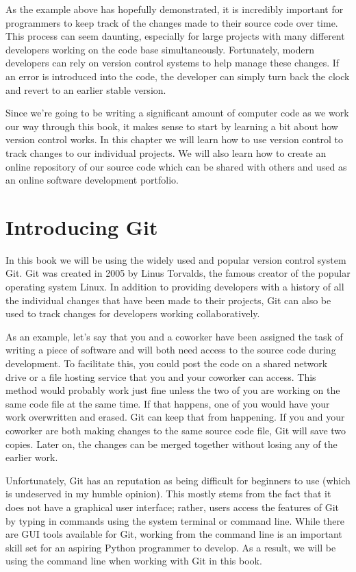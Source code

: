 \documentclass{book}
\begin{document}
As the example above has hopefully demonstrated, it is incredibly important for programmers to keep track of the changes made to their source code over time. This process can seem daunting, especially for large projects with many different developers working on the code base simultaneously. Fortunately, modern developers can rely on version control systems to help manage these changes. If an error is introduced into the code, the developer can simply turn back the clock and revert to an earlier stable version. 

Since we're going to be writing a significant amount of computer code as we work our way through this book, it makes sense to start by learning a bit about how version control works. In this chapter we will learn how to use version control to track changes to our individual projects. We will also learn how to create an online repository of our source code which can be shared with others and used as an online software development portfolio.

\section{Introducing Git}

In this book we will be using the widely used and popular version control system Git\texttrademark. Git was created in 2005 by Linus Torvalds, the famous creator of the popular operating system Linux. In addition to providing developers with a history of all the individual changes that have been made to their projects, Git can also be used to track changes for developers working collaboratively. 

As an example, let's say that you and a coworker have been assigned the task of writing a piece of software and will both need access to the source code during development. To facilitate this, you could post the code on a shared network drive or a file hosting service that you and your coworker can access. This method would probably work just fine unless the two of you are working on the same code file at the same time. If that happens, one of you would have your work overwritten and erased. Git can keep that from happening. If you and your coworker are both making changes to the same source code file, Git will save two copies. Later on, the changes can be merged together without losing any of the earlier work. 

Unfortunately, Git has an reputation as being difficult for beginners to use (which is undeserved in my humble opinion). This mostly stems from the fact that it does not have a graphical user interface; rather, users access the features of Git by typing in commands using the system terminal or command line. While there are GUI tools available for Git, working from the command line is an important skill set for an aspiring Python programmer to develop. As a result, we will be using the command line when working with Git in this book. 
\end{document}
